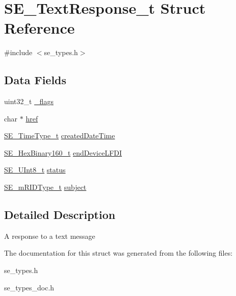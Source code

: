 \hypertarget{structSE__TextResponse__t}{}\section{S\+E\+\_\+\+Text\+Response\+\_\+t Struct Reference}
\label{structSE__TextResponse__t}


{\ttfamily \#include $<$se\+\_\+types.\+h$>$}

\subsection*{Data Fields}
\begin{DoxyCompactItemize}
\item 
uint32\+\_\+t \hyperlink{group__TextResponse_gacb1bf1b7276dc2a59fed4f769e923a62}{\+\_\+flags}
\item 
char $\ast$ \hyperlink{group__TextResponse_gaa17772b7549b6e16b7597dc1351bdfda}{href}
\item 
\hyperlink{group__TimeType_ga6fba87a5b57829b4ff3f0e7638156682}{S\+E\+\_\+\+Time\+Type\+\_\+t} \hyperlink{group__TextResponse_gae6f82efd8b9863fc334ac5e17051c4a6}{created\+Date\+Time}
\item 
\hyperlink{group__HexBinary160_ga92b92aa55555bdb75f3a59060f2c1632}{S\+E\+\_\+\+Hex\+Binary160\+\_\+t} \hyperlink{group__TextResponse_gaf6d8ec98b273a16ab08cc67d7646c0d3}{end\+Device\+L\+F\+DI}
\item 
\hyperlink{group__UInt8_gaf7c365a1acfe204e3a67c16ed44572f5}{S\+E\+\_\+\+U\+Int8\+\_\+t} \hyperlink{group__TextResponse_ga80b24a0bd8f2e030d06c5ba2512a1b1a}{status}
\item 
\hyperlink{group__mRIDType_gac74622112f3a388a2851b2289963ba5e}{S\+E\+\_\+m\+R\+I\+D\+Type\+\_\+t} \hyperlink{group__TextResponse_ga20b727bc040f883df2fcdaf506f859ab}{subject}
\end{DoxyCompactItemize}


\subsection{Detailed Description}
A response to a text message 

The documentation for this struct was generated from the following files\+:\begin{DoxyCompactItemize}
\item 
se\+\_\+types.\+h\item 
se\+\_\+types\+\_\+doc.\+h\end{DoxyCompactItemize}
